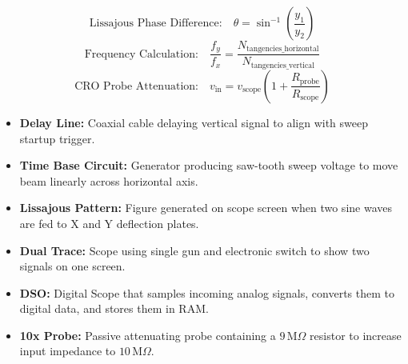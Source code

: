 \documentclass[12pt,a4paper]{article}
\begin{document}
\begin{tcolorbox}[formulabox, title={\textbf{Key Oscilloscope Equations}}]
$$\text{Lissajous Phase Difference:} \quad \theta = \sin^{-1}\left(\frac{y_1}{y_2}\right)$$
$$\text{Frequency Calculation:} \quad \frac{f_y}{f_x} = \frac{N_{\text{tangencies\_horizontal}}}{N_{\text{tangencies\_vertical}}}$$
$$\text{CRO Probe Attenuation:} \quad v_{\text{in}} = v_{\text{scope}} \left(1 + \frac{R_{\text{probe}}}{R_{\text{scope}}}\right)$$
\end{tcolorbox}

\begin{tcolorbox}[defbox, title={\textbf{One-Line Definitions}}]
\begin{itemize}[leftmargin=*, itemsep=2.5pt, topsep=0pt]
  \item \textbf{Delay Line:} Coaxial cable delaying vertical signal to align with sweep startup trigger.
  \item \textbf{Time Base Circuit:} Generator producing saw-tooth sweep voltage to move beam linearly across horizontal axis.
  \item \textbf{Lissajous Pattern:} Figure generated on scope screen when two sine waves are fed to X and Y deflection plates.
  \item \textbf{Dual Trace:} Scope using single gun and electronic switch to show two signals on one screen.
  \item \textbf{DSO:} Digital Scope that samples incoming analog signals, converts them to digital data, and stores them in RAM.
  \item \textbf{10x Probe:} Passive attenuating probe containing a $9\,\text{M}\Omega$ resistor to increase input impedance to $10\,\text{M}\Omega$.
\end{itemize}
\end{tcolorbox}
\end{document}
